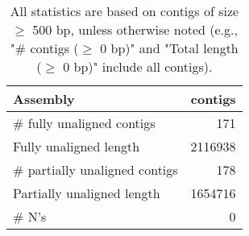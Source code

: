 \documentclass[12pt,a4paper]{article}
\begin{document}
\begin{table}[ht]
\begin{center}
\caption{All statistics are based on contigs of size $\geq$ 500 bp, unless otherwise noted (e.g., "\# contigs ($\geq$ 0 bp)" and "Total length ($\geq$ 0 bp)" include all contigs).}
\begin{tabular}{|l*{1}{|r}|}
\hline
Assembly & contigs \\ \hline
\# fully unaligned contigs & 171 \\ \hline
Fully unaligned length & 2116938 \\ \hline
\# partially unaligned contigs & 178 \\ \hline
Partially unaligned length & 1654716 \\ \hline
\# N's & 0 \\ \hline
\end{tabular}
\end{center}
\end{table}
\end{document}
